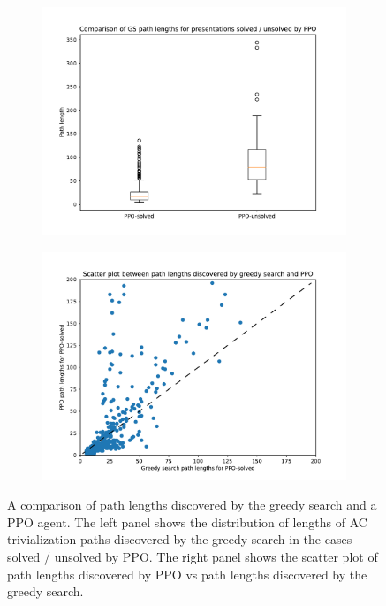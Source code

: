 \begin{figure}
	\centering
	\begin{subfigure}[b]{0.5\textwidth}
		\includegraphics[width=\textwidth]{fig/path_lengths_ppo_solved_vs_unsolved.pdf}
		\caption{}
	\label{fig:path_lengths_ppo_solved_vs_unsolved}
	\end{subfigure}%
	\begin{subfigure}[b]{0.5\textwidth}
		\centering
		\includegraphics[width=\textwidth]{fig/path_lengths_gs_vs_ppo.pdf}
		\caption{}
		\label{fig:path_lengths_gs_vs_ppo}
	\end{subfigure}
	\caption{A comparison of path lengths discovered by the greedy search and a PPO agent. The left panel shows the distribution of lengths of AC trivialization paths discovered by the greedy search in the cases solved / unsolved by PPO. The right panel shows the scatter plot of path lengths discovered by PPO vs path lengths discovered by the greedy search.}
	\label{fig:path_lengths_gs_vs_ppo_full}
\end{figure}

